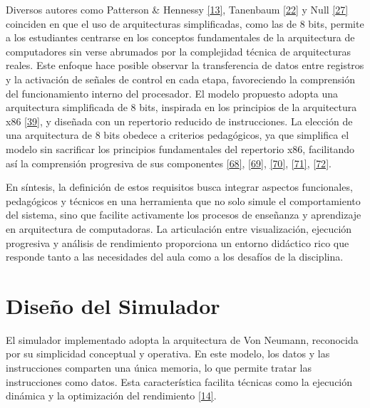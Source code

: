 \documentclass[12pt,oneside]{templates/unerthesis}
\begin{document}
Diversos autores como Patterson \& Hennessy \protect\hyperlink{ref-hennessy2017computer}{{[}13{]}}, Tanenbaum \protect\hyperlink{ref-tanenbaum_structured_2016}{{[}22{]}} y Null \protect\hyperlink{ref-null_essentials_2023}{{[}27{]}} coinciden en que el uso de arquitecturas simplificadas, como las de 8 bits, permite a los estudiantes centrarse en los conceptos fundamentales de la arquitectura de computadores sin verse abrumados por la complejidad técnica de arquitecturas reales. Este enfoque hace posible observar la transferencia de datos entre registros y la activación de señales de control en cada etapa, favoreciendo la comprensión del funcionamiento interno del procesador.
El modelo propuesto adopta una arquitectura simplificada de 8 bits, inspirada en los principios de la arquitectura x86 \protect\hyperlink{ref-intel_microarchitecture_2021}{{[}39{]}}, y diseñada con un repertorio reducido de instrucciones. La elección de una arquitectura de 8 bits obedece a criterios pedagógicos, ya que simplifica el modelo sin sacrificar los principios fundamentales del repertorio x86, facilitando así la comprensión progresiva de sus componentes \protect\hyperlink{ref-patt2019introduction}{{[}68{]}}, \protect\hyperlink{ref-majid1999design}{{[}69{]}}, \protect\hyperlink{ref-morlan_sap1_2021}{{[}70{]}}, \protect\hyperlink{ref-Guald_2015_thesis}{{[}71{]}}, \protect\hyperlink{ref-silber_tinycpu}{{[}72{]}}.

En síntesis, la definición de estos requisitos busca integrar aspectos funcionales, pedagógicos y técnicos en una herramienta que no solo simule el comportamiento del sistema, sino que facilite activamente los procesos de enseñanza y aprendizaje en arquitectura de computadoras. La articulación entre visualización, ejecución progresiva y análisis de rendimiento proporciona un entorno didáctico rico que responde tanto a las necesidades del aula como a los desafíos de la disciplina.

\hypertarget{diseuxf1o-del-simulador}{%
\section{Diseño del Simulador}\label{diseuxf1o-del-simulador}}

El simulador implementado adopta la arquitectura de Von Neumann, reconocida por su simplicidad conceptual y operativa. En este modelo, los datos y las instrucciones comparten una única memoria, lo que permite tratar las instrucciones como datos. Esta característica facilita técnicas como la ejecución dinámica y la optimización del rendimiento \protect\hyperlink{ref-stallings_computer_2021}{{[}14{]}}.
\end{document}

